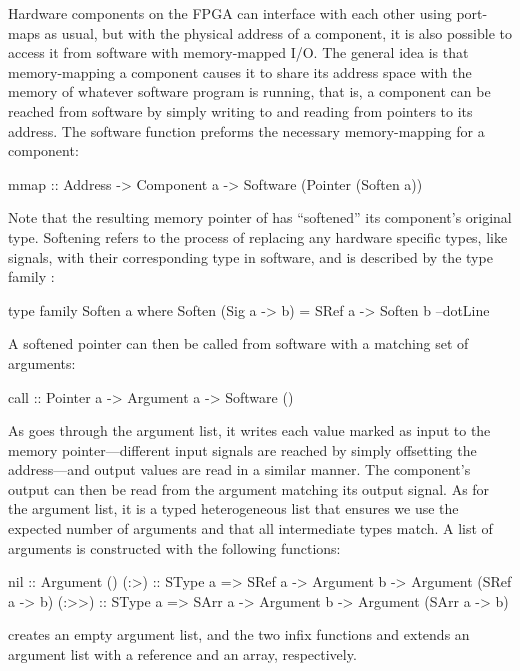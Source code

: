 \documentclass[../paper.tex]{subfiles}
\begin{document}
Hardware components on the FPGA can interface with each other using port-maps as usual, but with the physical address of a component, it is also possible to access it from software with memory-mapped I/O. The general idea is that memory-mapping a component causes it to share its address space with the memory of whatever software program is running, that is, a component can be reached from software by simply writing to and reading from pointers to its address. The software function  preforms the necessary memory-mapping for a component:

\begin{code}
mmap :: Address -> Component a -> Software (Pointer (Soften a))
\end{code}

\noindent Note that the resulting memory pointer of  has ``softened'' its component's original type. Softening refers to the process of replacing any hardware specific types, like signals, with their corresponding type in software, and is described by the type family :

\begin{code}
type family Soften a where
  Soften (Sig a -> b) = SRef a -> Soften b
  --dotLine
\end{code}

A softened pointer can then be called from software with a matching set of arguments:

\begin{code}
call :: Pointer a -> Argument a -> Software ()
\end{code}

\noindent As  goes through the argument list, it writes each value marked as input to the memory pointer---different input signals are reached by simply offsetting the address---and output values are read in a similar manner. The component's output can then be read from the argument matching its output signal. As for the argument list, it is a typed heterogeneous list that ensures we use the expected number of arguments and that all intermediate types match. A list of arguments is constructed with the following functions:

\begin{code}
nil   :: Argument ()
(:>)  :: SType a => SRef a -> Argument b -> Argument (SRef a -> b)
(:>>) :: SType a => SArr a -> Argument b -> Argument (SArr a -> b)
\end{code}

\noindent {} creates an empty argument list, and the two infix functions \codei{(:>)} and \codei{(:>>)} extends an argument list with a reference and an array, respectively.
\end{document}
